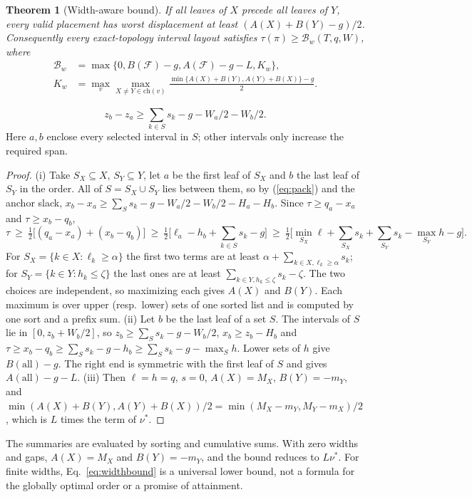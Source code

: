 \documentclass[10pt]{article}
\newtheorem{theorem}{Theorem}\newtheorem{lemma}{Lemma}\newtheorem{proposition}{Proposition}
\begin{document}
\begin{theorem}[Width-aware bound]\label{thm:width}
If all leaves of $X$ precede all leaves of $Y$, every valid placement has worst displacement at least $(A(X)+B(Y)-g)/2$. Consequently every exact-topology interval layout satisfies $\tau(\pi)\ge\mathcal{B}_w(T,q,W)$, where
\begin{equation}\label{eq:widthbound}
\begin{aligned}
\mathcal{B}_w&=\max\{0,B(\mathcal{F})-g,A(\mathcal{F})-g-L,K_w\},\\
K_w&=\max_v\max_{X\ne Y\in\mathrm{ch}(v)}
 \frac{\min\{A(X)+B(Y),A(Y)+B(X)\}-g}{2}.
\end{aligned}
\end{equation}
\end{theorem}
\begin{equation}\label{eq:pack}
 z_b-z_a\ge\sum_{k\in S}s_k-g-W_a/2-W_b/2.
\end{equation}
Here $a,b$ enclose every selected interval in $S$; other intervals only increase the required span.
\begin{proof}
(i) Take $S_X\subseteq X$, $S_Y\subseteq Y$, let $a$ be the first leaf of $S_X$ and $b$ the last leaf of $S_Y$ in the order. All of $S=S_X\cup S_Y$ lies between them, so by (\ref{eq:pack}) and the anchor slack, $x_b-x_a\ge\sum_S s_k-g-W_a/2-W_b/2-H_a-H_b$. Since $\tau\ge q_a-x_a$ and $\tau\ge x_b-q_b$,
\[
\tau\ \ge\ \tfrac12\big[(q_a-x_a)+(x_b-q_b)\big]\ \ge\ \tfrac12\Big[\ell_a-h_b+\sum_{k\in S}s_k-g\Big]\ \ge\ \tfrac12\Big[\min_{S_X}\ell+\sum_{S_X}s_k+\sum_{S_Y}s_k-\max_{S_Y}h-g\Big].
\]
For $S_X=\{k\in X:\ell_k\ge\alpha\}$ the first two terms are at least $\alpha+\sum_{k\in X,\ell_k\ge\alpha}s_k$; for $S_Y=\{k\in Y:h_k\le\zeta\}$ the last ones are at least $\sum_{k\in Y,h_k\le\zeta}s_k-\zeta$. The two choices are independent, so maximizing each gives $A(X)$ and $B(Y)$. Each maximum is over upper (resp.\ lower) sets of one sorted list and is computed by one sort and a prefix sum.
(ii) Let $b$ be the last leaf of a set $S$. The intervals of $S$ lie in $[0,z_b+W_b/2]$, so $z_b\ge\sum_S s_k-g-W_b/2$, $x_b\ge z_b-H_b$ and $\tau\ge x_b-q_b\ge\sum_S s_k-g-h_b\ge\sum_S s_k-g-\max_S h$. Lower sets of $h$ give $B(\mathrm{all})-g$. The right end is symmetric with the first leaf of $S$ and gives $A(\mathrm{all})-g-L$.
(iii) Then $\ell=h=q$, $s=0$, $A(X)=M_X$, $B(Y)=-m_Y$, and $\min(A(X)+B(Y),A(Y)+B(X))/2=\min(M_X-m_Y,M_Y-m_X)/2$, which is $L$ times the term of $\nu^*$.
\end{proof}
The summaries are evaluated by sorting and cumulative sums. With zero widths and gaps, $A(X)=M_X$ and $B(Y)=-m_Y$, and the bound reduces to $L\nu^*$. For finite widths, Eq.~\ref{eq:widthbound} is a universal lower bound, not a formula for the globally optimal order or a promise of attainment.
\end{document}
